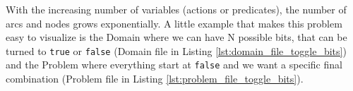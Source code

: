 With the increasing number of variables (actions or predicates), the number of arcs
and nodes grows exponentially. A little example that makes this problem easy to
visualize is the Domain where we can have N possible bits, that can be turned to
\texttt{true} or \texttt{false} (Domain file in Listing
\ref{lst:domain_file_toggle_bits}) and the Problem where everything start at \texttt{false}
and we want a specific final combination (Problem file in Listing \ref{lst:problem_file_toggle_bits}).

\begin{figure}[h!]
  \noindent
  \begin{minipage}{0.33\textwidth}
    \centering

    \vspace{1cm} %


\end{minipage}
\end{figure}
